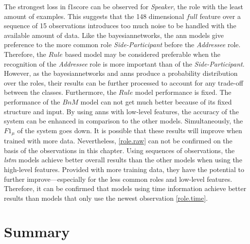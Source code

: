 The strongest loss in \gls{f1score} can be observed for \emph{Speaker}, the role with the least amount of examples.  
This suggests that the 148 dimensional \(full\) feature over a sequence of 15 observations introduces too much noise to be handled with the available amount of data.
Like the \glspl{bayesiannetwork}, the \gls{ann} models give preference to the more common role \emph{Side-Participant} before the \emph{Addressee} role.
Therefore, the \(Rule\) based model may be considered preferable when the recognition of the \emph{Addressee} role is more important than of the \emph{Side-Participant}.
However, as the \glspl{bayesiannetwork} and \glspl{ann} produce a probability distribution over the roles, their results can be further processed to account for any trade-off between the classes.
Furthermore, the \(Rule\) model performance is fixed.
The performance of the \(BnM\) model can not get much better because of its fixed structure and input.
By using \glspl{ann} with low-level features, the \gls{accuracy} of the system can be enhanced in comparison to the other models.
Simultaneously, the \(F1_\mu\) of the system goes down.
It is possible that these results will improve when trained with more data.
Nevertheless, \cref{role.raw} can not be confirmed on the basis of the observations in this chapter.
Using sequences of observations, the \emph{lstm} models achieve better overall results than the other models when using the high-level features.
Provided with more training data, they have the potential to further improve---especially for the less common roles and low-level features.
Therefore, it can be confirmed that models using time information achieve better results than models that only use the newest observation \cref{role.time}.

\section{Summary}

